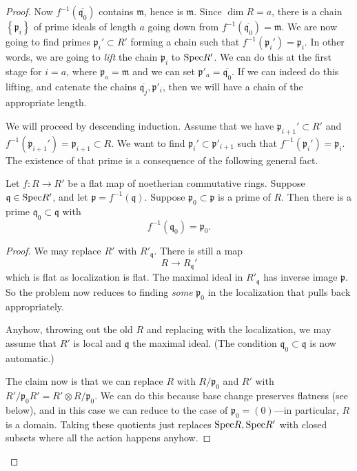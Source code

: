 \begin{proof}
Now $f^{-1}(\overline{\mathfrak{q}_0})$ contains $\mathfrak{m}$, hence is
$\mathfrak{m}$. Since $\dim R = a$, there is a chain
$\left\{\mathfrak{p}_i\right\}$ of prime ideals of length
$a$ going down from $f^{-1}(\overline{\mathfrak{q}_0}) = \mathfrak{m}$. We are 
now going to find primes $\mathfrak{p}_i' \subset R'$ forming a chain such that
$f^{-1}(\mathfrak{p}_i') = \mathfrak{p}_i$. In other words, we are going to
\emph{lift} the chain $\mathfrak{p}_i$ to $\mathrm{Spec} R'$. We can do this at the
first stage for $i=a$, where $\mathfrak{p}_a = \mathfrak{m}$ and we can set
$\mathfrak{p}'_a = \overline{\mathfrak{q}_0}$. If we can indeed do this
lifting, and catenate the chains $\overline{\mathfrak{q}_j}, \mathfrak{p}'_i$,
then we will have a chain of the appropriate length.

We will proceed by descending induction. Assume that we have
$\mathfrak{p}_{i+1}' \subset R'$ and $f^{-1}(\mathfrak{p}_{i+1}') =
\mathfrak{p}_{i+1} \subset R$. We want to find $\mathfrak{p}_i' \subset
\mathfrak{p}'_{i+1}$ such that $f^{-1}(\mathfrak{p}_i') = \mathfrak{p}_i$. The
existence of that prime is a consequence of the following general fact.

\begin{theorem} Let $f: R \to R'$ be a flat map of
noetherian commutative
rings. Suppose $\mathfrak{q} \in \mathrm{Spec} R'$, and let $\mathfrak{p}
=f^{-1}(\mathfrak{q})$. Suppose $\mathfrak{p}_0 \subset \mathfrak{p}$ is a
prime of $R$. Then there is a prime $\mathfrak{q}_0 \subset \mathfrak{q}$ with 
\[ f^{-1}(\mathfrak{q}_0) = \mathfrak{p}_0.  \]
\end{theorem} 
\begin{proof} 
We may replace $R'$ with $R'_{\mathfrak{q}}$. There is still a map
\[ R \to R_{\mathfrak{q}}'  \]
which is flat as localization is flat. The maximal ideal in $R'_{\mathfrak{q}}$
has inverse image $\mathfrak{p}$. So the problem now reduces to finding
\emph{some} $\mathfrak{p}_0$ in the localization that pulls back appropriately.

Anyhow, throwing out the old $R$ and replacing with the localization, we may
assume that $R'$ is local and $\mathfrak{q}$ the maximal ideal. (The condition
$\mathfrak{q}_0 \subset \mathfrak{q}$ is now automatic.) 

The claim now is that we can replace $R$ with $R/\mathfrak{p}_0$ and $R'$ with
$R'/\mathfrak{p}_0 R' = R' \otimes R/\mathfrak{p}_0$. We can do this because
base change preserves flatness (see below), and in this case we can reduce to the case of
$\mathfrak{p}_0 = (0)$---in particular, $R$ is a domain. 
Taking these quotients just replaces $\mathrm{Spec} R, \mathrm{Spec} R'$ with closed subsets
where all the action happens anyhow.


\end{proof}
\end{proof}
